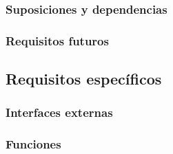 \documentclass{article}
\begin{document}


        \subsubsection{Suposiciones y dependencias}





        \subsubsection{Requisitos futuros}





    \subsection{Requisitos específicos}





        \subsubsection{Interfaces externas}





        \subsubsection{Funciones}
\end{document}
